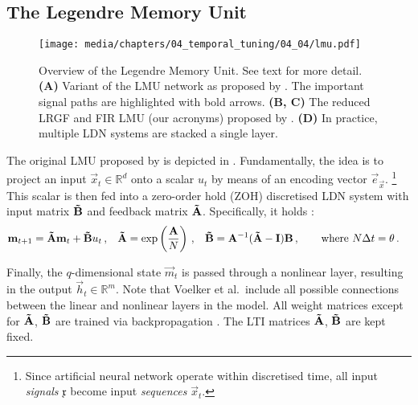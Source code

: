 

\subsection{The Legendre Memory Unit}
\label{sec:lmu}

\begin{figure}[p]
	\centering
	\texttt{[image: media/chapters/04\_temporal\_tuning/04\_04/lmu.pdf]}%
	{\label{fig:lmu_a}}%
	{\label{fig:lmu_b}}%
	{\label{fig:lmu_c}}%
	{\label{fig:lmu_d}}%
	\caption[Overview of the Legendre Memory Unit]{Overview of the Legendre Memory Unit. See text for more detail. \textbf{(A)} Variant of the LMU network as proposed by \citet{voelker2019lmu}. The important signal paths are highlighted with bold arrows.
	\textbf{(B, C)} The reduced LRGF and FIR LMU (our acronyms) proposed by \citet{chilkuri2021parallelizing}. \textbf{(D)} In practice, multiple LDN systems are stacked a single layer.}
\end{figure}

The original LMU proposed by \citet{voelker2019lmu} is depicted in .
Fundamentally, the idea is to project an input $\vec x_t \in \mathbb{R}^d$ onto a scalar $u_t$ by means of an encoding vector $\vec e_{\vec x}$.%
\footnote{Since artificial neural network operate within discretised time, all input \emph{signals} $\mathfrak{x}$ become input \emph{sequences} ${\vec x}_t$.}
This scalar is then fed into a zero-order hold (ZOH) discretised LDN system with input matrix $\mathbf{\tilde B}$ and feedback matrix $\mathbf{\tilde A}$.
Specifically, it holds \citep[e.g.,][Section~9.8]{brogan1991modern}:
\begin{align}
	\mathbf{m}_{t + 1} &= \mathbf{\tilde A} \mathbf{m}_t + \mathbf{\tilde B} u_t \,,
	& \mathbf{\tilde A} &= \exp\left(\frac{\mathbf{A}}{N}\right) \,,
	& \mathbf{\tilde B} &= {\mathbf{A}}^{-1} (\mathbf{\tilde A} - \mathbf{I}) \mathbf{B} \,,
	\quad\quad \text{where } N \Delta t = \theta \,.
	\label{eqn:ldn_discretisation}
\end{align}

Finally, the $q$-dimensional state $\vec m_t$ is passed through a nonlinear layer, resulting in the output $\vec{h}_t \in \mathbb{R}^m$.
Note that Voelker et al.~include all possible connections between the linear and nonlinear layers in the model.
All weight matrices except for $\mathbf{\tilde A}$, $\mathbf{\tilde B}$ are trained via backpropagation \citep[e.g.,][Section~5.3]{bishop2006pattern}.
The LTI matrices $\mathbf{\tilde A}$, $\mathbf{\tilde B}$ are kept fixed.

